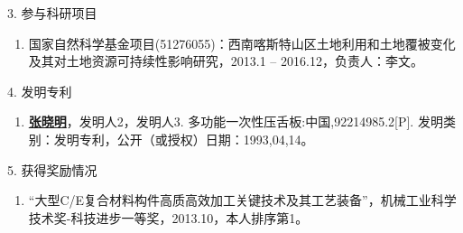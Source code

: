 \begin{achievement}
3. 参与科研项目
\begin{enumerate}[nosep, label=$\lbrack$\arabic*$\rbrack$]
  \item{国家自然科学基金项目(51276055)：西南喀斯特山区土地利用和土地覆被变化及其对土地资源可持续性影响研究，2013.1 – 2016.12，负责人：李文。} %
\end{enumerate}{}\vspace{1em}

4. 发明专利
\begin{enumerate}[nosep, label=$\lbrack$\arabic*$\rbrack$]
  \item{\underline{\bf 张晓明}，发明人2，发明人3. 多功能一次性压舌板:中国,92214985.2[P]. 发明类别：发明专利，公开（或授权）日期：1993,04,14。}
\end{enumerate}{}\vspace{1em}

5. 获得奖励情况
\begin{enumerate}[nosep, label=$\lbrack$\arabic*$\rbrack$]
  \item{“大型C/E复合材料构件高质高效加工关键技术及其工艺装备”，机械工业科学技术奖-科技进步一等奖，2013.10，本人排序第1。}
\end{enumerate}

\end{achievement}



